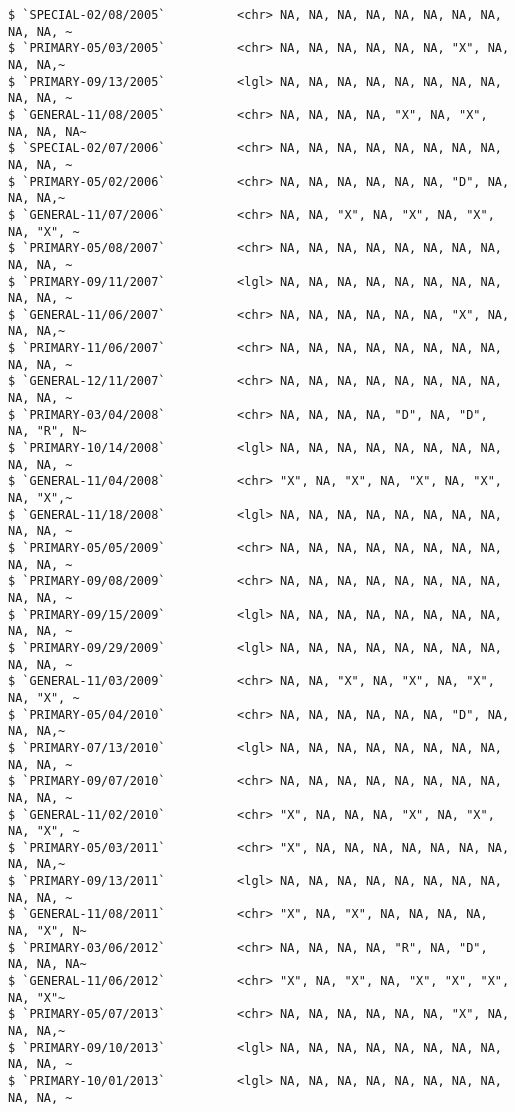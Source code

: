 \documentclass[
  letterpaper,
  DIV=11,
  numbers=noendperiod]{scrartcl}
\begin{document}
\begin{verbatim}
$ `SPECIAL-02/08/2005`          <chr> NA, NA, NA, NA, NA, NA, NA, NA, NA, NA, ~
$ `PRIMARY-05/03/2005`          <chr> NA, NA, NA, NA, NA, NA, "X", NA, NA, NA,~
$ `PRIMARY-09/13/2005`          <lgl> NA, NA, NA, NA, NA, NA, NA, NA, NA, NA, ~
$ `GENERAL-11/08/2005`          <chr> NA, NA, NA, NA, "X", NA, "X", NA, NA, NA~
$ `SPECIAL-02/07/2006`          <chr> NA, NA, NA, NA, NA, NA, NA, NA, NA, NA, ~
$ `PRIMARY-05/02/2006`          <chr> NA, NA, NA, NA, NA, NA, "D", NA, NA, NA,~
$ `GENERAL-11/07/2006`          <chr> NA, NA, "X", NA, "X", NA, "X", NA, "X", ~
$ `PRIMARY-05/08/2007`          <chr> NA, NA, NA, NA, NA, NA, NA, NA, NA, NA, ~
$ `PRIMARY-09/11/2007`          <lgl> NA, NA, NA, NA, NA, NA, NA, NA, NA, NA, ~
$ `GENERAL-11/06/2007`          <chr> NA, NA, NA, NA, NA, NA, "X", NA, NA, NA,~
$ `PRIMARY-11/06/2007`          <chr> NA, NA, NA, NA, NA, NA, NA, NA, NA, NA, ~
$ `GENERAL-12/11/2007`          <chr> NA, NA, NA, NA, NA, NA, NA, NA, NA, NA, ~
$ `PRIMARY-03/04/2008`          <chr> NA, NA, NA, NA, "D", NA, "D", NA, "R", N~
$ `PRIMARY-10/14/2008`          <lgl> NA, NA, NA, NA, NA, NA, NA, NA, NA, NA, ~
$ `GENERAL-11/04/2008`          <chr> "X", NA, "X", NA, "X", NA, "X", NA, "X",~
$ `GENERAL-11/18/2008`          <lgl> NA, NA, NA, NA, NA, NA, NA, NA, NA, NA, ~
$ `PRIMARY-05/05/2009`          <chr> NA, NA, NA, NA, NA, NA, NA, NA, NA, NA, ~
$ `PRIMARY-09/08/2009`          <chr> NA, NA, NA, NA, NA, NA, NA, NA, NA, NA, ~
$ `PRIMARY-09/15/2009`          <lgl> NA, NA, NA, NA, NA, NA, NA, NA, NA, NA, ~
$ `PRIMARY-09/29/2009`          <lgl> NA, NA, NA, NA, NA, NA, NA, NA, NA, NA, ~
$ `GENERAL-11/03/2009`          <chr> NA, NA, "X", NA, "X", NA, "X", NA, "X", ~
$ `PRIMARY-05/04/2010`          <chr> NA, NA, NA, NA, NA, NA, "D", NA, NA, NA,~
$ `PRIMARY-07/13/2010`          <lgl> NA, NA, NA, NA, NA, NA, NA, NA, NA, NA, ~
$ `PRIMARY-09/07/2010`          <chr> NA, NA, NA, NA, NA, NA, NA, NA, NA, NA, ~
$ `GENERAL-11/02/2010`          <chr> "X", NA, NA, NA, "X", NA, "X", NA, "X", ~
$ `PRIMARY-05/03/2011`          <chr> "X", NA, NA, NA, NA, NA, NA, NA, NA, NA,~
$ `PRIMARY-09/13/2011`          <lgl> NA, NA, NA, NA, NA, NA, NA, NA, NA, NA, ~
$ `GENERAL-11/08/2011`          <chr> "X", NA, "X", NA, NA, NA, NA, NA, "X", N~
$ `PRIMARY-03/06/2012`          <chr> NA, NA, NA, NA, "R", NA, "D", NA, NA, NA~
$ `GENERAL-11/06/2012`          <chr> "X", NA, "X", NA, "X", "X", "X", NA, "X"~
$ `PRIMARY-05/07/2013`          <chr> NA, NA, NA, NA, NA, NA, "X", NA, NA, NA,~
$ `PRIMARY-09/10/2013`          <lgl> NA, NA, NA, NA, NA, NA, NA, NA, NA, NA, ~
$ `PRIMARY-10/01/2013`          <lgl> NA, NA, NA, NA, NA, NA, NA, NA, NA, NA, ~

\end{verbatim}
\end{document}
